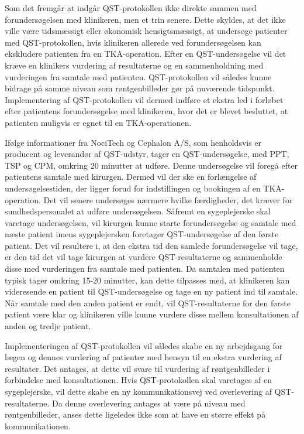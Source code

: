 Som det fremgår at  indgår QST-protokollen ikke direkte sammen med forundersøgelsen med klinikeren, men et trin senere. Dette skyldes, at det ikke ville være tidsmæssigt eller økonomisk hensigtsmæssigt, at undersøge patienter med QST-protokollen, hvis klinikeren allerede ved forundersøgelsen kan ekskludere patienten fra en TKA-operation. Efter en QST-undersøgelse vil det kræve en klinikers vurdering af resultaterne og en sammenholdning med vurderingen fra samtale med patienten. QST-protokollen vil således kunne bidrage på samme niveau som røntgenbilleder gør på nuværende tidspunkt. Implementering af QST-protokollen vil dermed indføre et ekstra led i forløbet efter patientens forundersøgelse med klinikeren, hvor det er blevet besluttet, at patienten muligvis er egnet til en TKA-operationen. 

Ifølge informationer fra NociTech og Cephalon A/S, som henholdsvis er producent og leverandør af QST-udstyr, tager en QST-undersøgelse, med PPT, TSP og CPM, omkring 20 minutter at udføre. Denne undersøgelse vil foregå efter patientens samtale med kirurgen. Dermed vil der ske en forlængelse af undersøgelsestiden, der ligger forud for indstillingen og bookingen af en TKA-operation. Det vil senere undersøges nærmere hvilke færdigheder, det kræver for sundhedspersonalet at udføre undersøgelsen. Såfremt en sygeplejerske skal varetage undersøgelsen, vil kirurgen kunne starte forundersøgelse og samtale med næste patient imens sygeplejersken foretager QST-undersøgelse af den første patient. Det vil resultere i, at den ekstra tid den samlede forundersøgelse vil tage, er den tid det vil tage kirurgen at vurdere QST-resultaterne og sammenholde disse med vurderingen fra samtale med patienten. Da samtalen med patienten typisk tager omkring 15-20 minutter,  kan dette tilpasses med, at klinikeren kan videresende en patient til QST-undersøgelse og tage en ny patient ind til samtale. Når samtale med den anden patient er endt, vil QST-resultaterne for den første patient være klar og klinikeren ville kunne vurdere disse mellem konsultationen af anden og tredje patient.

Implementeringen af QST-protokollen vil således skabe en ny arbejdsgang for lægen og dennes vurdering af patienter med hensyn til en ekstra vurdering af resultater. Det antages, at dette vil svare til vurdering af røntgenbilleder i forbindelse med konsultationen.
Hvis QST-protokollen skal varetages af en sygeplejerske, vil dette skabe en ny kommunikationsvej ved overlevering af QST-resultaterne. Da denne overlevering antages at være på niveau med røntgenbilleder, anses dette ligeledes ikke som at have en større effekt på kommunikationen. 


